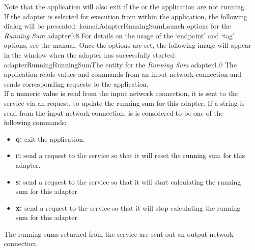 Note that the application will also exit if the  or the
 application are not running.\\

If the adapter is selected for execution from within the \emph{\CMU} application, the
following dialog will be presented:
%
{launchAdapterRunningSum}{Launch options for the \emph{Running Sum} adapter}{0.8}
\condPage{}
For details on the usage of the `endpoint' and `tag' options, see the \emph{\CMU} manual.
Once the options are set, the following image will appear in the \emph{\CMU} window when
the adapter has successfully started:
%
{adapterRunningRunningSum}{The \emph{\CMU} entity for the \emph{Running Sum} adapter}{1.0}
The  application reads  values and
commands from an input \yarp{} network connection and sends corresponding requests to the
 application.\\

If a numeric value is read from the input \yarp{} network connection, it is sent to the
service via an  request, to update the running
sum for this adapter.
If a string is read from the input \yarp{} network connection, is is considered to be one
of the following commands:
\begin{itemize}
\item\textbf{q:} exit the application.
\item\exSp\textbf{r:} send a  request to the
service so that it will reset the running sum for this adapter.
\item\exSp\textbf{s:} send a  request to the
service so that it will start calculating the running sum for this adapter.
\item\exSp\textbf{x:} send a  request to the
service so that it will stop calculating the running sum for this adapter.
\end{itemize}
The running sums returned from the service are sent out an output \yarp{} network
connection.\\

